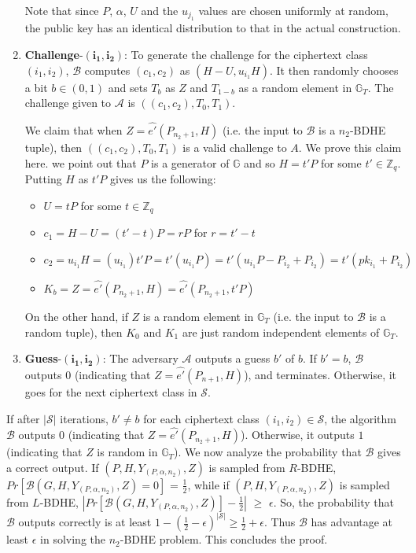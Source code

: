 \begin{enumerate}
 Note that since $P$, $\alpha$, $U$ and the $u_{j_1}$ values are chosen uniformly at random, the public key has an identical distribution to that in the actual construction.
 
 \item \textbf{Challenge}-$\mathbf{(i_1,i_2)}$: To generate the challenge for the ciphertext class $(i_1,i_2)$, $\mathcal{B}$ computes $(c_1,c_2)$ as $(H-U,u_{i_1}H)$. It then randomly chooses a bit $b\in{(0,1)}$ and sets $T_b$ as $Z$ and $T_{1-b}$ as a random element in $\mathbb{G}_T$. The challenge given to $\mathcal{A}$ is $((c_1,c_2),T_0,T_1)$. 
 
 We claim that when $Z=\hat{e'}(P_{n_2+1},H)$ (i.e. the input to $\mathcal{B}$ is a $n_2$-BDHE tuple), then $((c_1,c_2),T_0,T_1)$ is a valid challenge to $A$. We prove this claim here. we point out that $P$ is a generator of $\mathbb{G}$ and so $H=t'P$ for some $t'\in\mathbb{Z}_q$. Putting $H$ as $t'P$ gives us the following:
 \begin{itemize}
  \item  $U=tP$ for some $t\in\mathbb{Z}_q$
  \item $c_1=H-U=(t'-t)P=rP$ for $r=t'-t$
  \item $c_2=u_{i_1}H=(u_{i_1})t'P=t'(u_{i_1}P)=t'(u_{i_1}P-P_{i_2}+P_{i_2})=t'(pk_{i_1}+P_{i_2})$
  \item $K_b=Z=\hat{e'}(P_{n_2+1},H)=\hat{e'}(P_{n_2+1},t'P)$
 \end{itemize}
 On the other hand, if $Z$ is a random element in $\mathbb{G}_T$ (i.e. the input to $\mathcal{B}$ is a random tuple), then $K_0$ and $K_1$ are just random independent elements of $\mathbb{G}_T$.
 
 \item\textbf{Guess}-$\mathbf{(i_1,i_2)}$: The adversary $\mathcal{A}$ outputs a guess $b'$ of $b$. If $b' = b$, $\mathcal{B}$ outputs $0$ (indicating that $Z = \hat{e'}(P_{n+1},H)$), and terminates. Otherwise, it goes for the next ciphertext class in $\mathcal{S}$.
\end{enumerate}
If after $|\mathcal{S}|$ iterations, $b' \neq b$ for each ciphertext class $(i_1,i_2)\in\mathcal{S}$, the algorithm $\mathcal{B}$ outputs $0$ (indicating that $Z = \hat{e'}(P_{n_2+1},H)$). Otherwise, it outputs $1$ (indicating that $Z$ is random in $\mathbb{G}_T$). We now analyze the probability that $\mathcal{B}$ gives a correct output. If $(P,H,Y_{(P,\alpha,n_2)},Z)$ is sampled from $R$-BDHE, $Pr[\mathcal{B}(G,H,Y_{(P,\alpha,n_2)},Z)=0]$ = $\frac{1}{2}$, while if $(P,H,Y_{(P,\alpha,n_2)},Z)$ is sampled from $L$-BDHE, $|Pr[\mathcal{B}(G,H,Y_{(P,\alpha,n_2)},Z)]-\frac{1}{2}|$ $\geq$ $\epsilon$. So, the probability that $\mathcal{B}$ outputs correctly is at least $1-(\frac{1}{2}-\epsilon)^{|\mathcal{S}|} \geq \frac{1}{2}+\epsilon$. Thus $\mathcal{B}$ has advantage at least $\epsilon$ in solving the $n_2$-BDHE problem. This concludes the proof.



